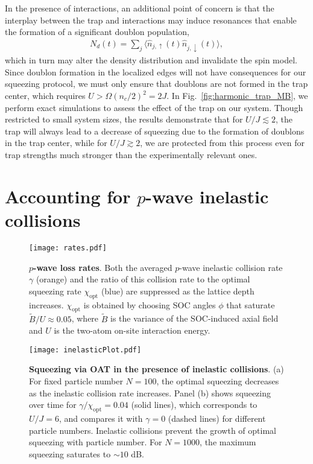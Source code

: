 \documentclass[aps,prx,superscriptaddress,notitlepage,twocolumn,longbibliography]{revtex4-2}
\begin{document}
In the presence of interactions, an additional point of concern is that the interplay between the trap and interactions may induce resonances that enable the formation of a significant doublon population,
\begin{align}
    N_d(t) = \sum_j \langle\hat{n}_{j,\uparrow}(t)\hat{n}_{j,
    \downarrow}(t) \rangle,
    \label{eq:doublon}
\end{align}
which in turn may alter the density distribution and invalidate the spin model. Since doublon formation in the localized edges will not have consequences for our squeezing protocol, we must only ensure that doublons are not formed in the trap center, which requires $U > \Omega (n_c/2)^2 = 2J$\cite{pupillo2006extended}. In Fig.~\ref{fig:harmonic_trap_MB}, we perform exact simulations to assess the effect of the trap on our system. Though restricted to small system sizes, the results demonstrate that for $U/J \lesssim 2$, the trap will always lead to a decrease of squeezing due to the formation of doublons in the trap center, while for $U/J \gtrsim 2$, we are protected from this process even for trap strengths much stronger than the experimentally relevant ones.


\section{Accounting for $p$-wave inelastic collisions}
\label{sec:inelastic_collision}
\setcounter{figure}{0}

\begin{figure}[t]
\centering
\texttt{[image: rates.pdf]}
\caption{
{\bf $p$-wave loss rates}.
Both the averaged $p$-wave inelastic collision rate $\gamma$ (orange) and the ratio of this collision rate to the optimal squeezing rate $\chi_{\text{opt}}$ (blue) are suppressed as the lattice depth increases.
$\chi_{\text{opt}}$ is obtained by choosing SOC angles $\phi$ that saturate $\widetilde{B}/U\approx0.05$, where $\widetilde{B}$ is the variance of the SOC-induced axial field and $U$ is the two-atom on-site interaction energy.
}
\label{fig:inelastic_rates}
\end{figure}

\begin{figure*}[t]
\centering
\texttt{[image: inelasticPlot.pdf]}
\caption{\textbf{Squeezing via OAT in the presence of inelastic collisions}.
(a) For fixed particle number $N=100$, the optimal squeezing decreases as the inelastic collision rate increases.
Panel (b) shows squeezing over time for $\gamma/\chi_{\text{opt}}=0.04$ (solid lines), which corresponds to $U/J=6$,
and compares it with $\gamma=0$ (dashed lines) for  different particle numbers.
Inelastic collisions prevent the growth of optimal squeezing with particle number.
For $N=1000$, the maximum squeezing saturates to $\sim 10$ dB.
}
\label{fig:inelastic_squeezing}
\end{figure*}
\end{document}
